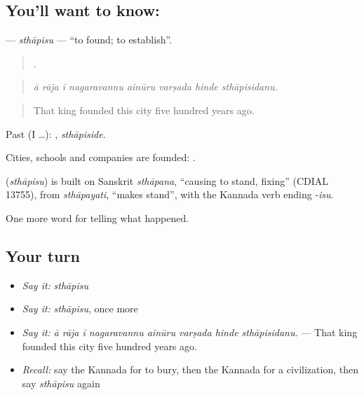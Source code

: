 \subsection*{You'll want to know: }
\textbf{} — \emph{sthāpisu} — \textquotedblleft{}to found; to establish\textquotedblright{}.

\begin{quote}
       .
\end{quote}

\begin{quote}
\emph{ā rāja ī nagaravannu ainūru varṣada hinde sthāpisidanu.}
\end{quote}

\begin{quote}
That king founded this city five hundred years ago.
\end{quote}

Past (I …): , \emph{sthāpiside}.

Cities, schools and companies are founded:  .

\begin{cousinweb}
\textbf{} (\emph{sthāpisu}) is built on Sanskrit \emph{sthāpana}, \textquotedblleft{}causing to stand, fixing\textquotedblright{} (CDIAL 13755), from \emph{sthāpayati}, \textquotedblleft{}makes stand\textquotedblright{}, with the Kannada verb ending -\emph{isu}.
\end{cousinweb}

\begin{grammarlens}[title={What you've built}]
One more word for telling what happened.
\end{grammarlens}

\subsection*{Your turn}
\begin{itemize}
\raggedright
  \item \emph{Say it:} \emph{sthāpisu}
  \item \emph{Say it:} \emph{sthāpisu}, once more
  \item \emph{Say it:} \emph{ā rāja ī nagaravannu ainūru varṣada hinde sthāpisidanu.} — That king founded this city five hundred years ago.
  \item \emph{Recall:} say the Kannada for to bury, then the Kannada for a civilization, then say \emph{sthāpisu} again
\end{itemize}

